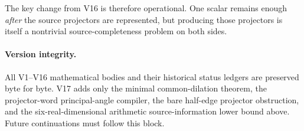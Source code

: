 \documentclass[11pt]{article}
\theoremstyle{definition}
\theoremstyle{remark}
\begin{document}
The key change from V16 is therefore operational.  One scalar remains enough
\emph{after} the source projectors are represented, but producing those
projectors is itself a nontrivial source-completeness problem on both sides.

\paragraph{Version integrity.}
All V1--V16 mathematical bodies and their historical status ledgers are
preserved byte for byte.  V17 adds only the minimal common-dilation theorem,
the projector-word principal-angle compiler, the bare half-edge projector
obstruction, and the six-real-dimensional arithmetic source-information lower
bound above.  Future continuations must follow this block.
\end{document}
